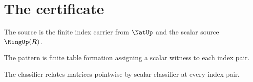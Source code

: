 \section{The certificate}

\begin{definition}
\label{def:matrix-source-specification}
The source is the finite index carrier from \(\NatUp\) and the scalar source \(\RingUp(R)\).
\end{definition}

\begin{definition}
\label{def:matrix-pattern-specification}
The pattern is finite table formation assigning a scalar witness to each index pair.
\end{definition}

\begin{definition}
\label{def:matrix-classifier-specification}
The classifier relates matrices pointwise by scalar classifier at every index pair.
\end{definition}

